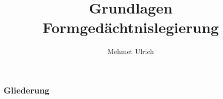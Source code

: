 \documentclass{beamer}
\title{Grundlagen Formgedächtnislegierung}
\author[Mehmet Ulrich]{Mehmet Ulrich}
\begin{document}
\frame{\titlepage}

\begin{frame}
\frametitle{Gliederung}
\tableofcontents[hideallsubsections]
\end{frame}



\end{document}
